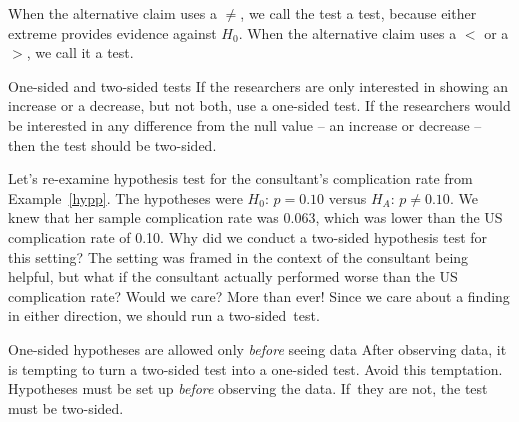 When the alternative claim uses a $\neq$, we call the test a  test, because either extreme provides evidence against $H_0$. When the alternative claim uses a $<$ or a $>$, we call it a  test.

\begin{onebox}{One-sided and two-sided tests}
If the researchers are only interested in showing an increase or a decrease, but not both, use a one-sided test. If the researchers would be interested in any difference from the null value -- an increase or decrease -- then the test should be two-sided.\vspace{0.5mm}\end{onebox}


\begin{examplewrap}
\begin{nexample}{Let's re-examine hypothesis test for the consultant's complication rate from Example~\ref{hypp}. The hypotheses were $H_0$: $p=0.10$ versus $H_A$: $p \neq 0.10$.  We knew that her sample complication rate was 0.063, which was lower than the US complication rate of 0.10. Why did we conduct a two-sided hypothesis test for this setting?}
The setting was framed in the context of the consultant being helpful, but what if the consultant actually performed worse than the US complication rate? Would we care? More than ever! Since we care about a finding in either direction, we should run a two-sided~test.
\end{nexample}
\end{examplewrap}

\D{\newpage}

\begin{onebox}{One-sided hypotheses are allowed only \emph{before} seeing data}
{After observing data, it is tempting to turn a two-sided test into a one-sided test. Avoid this temptation. Hypotheses must be set up \emph{before} observing the data. If~they are not, the test must be two-sided.}
\end{onebox}


